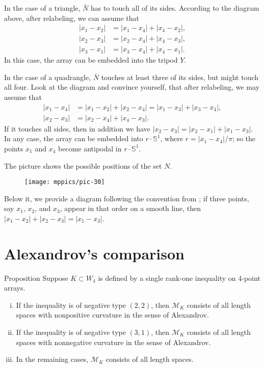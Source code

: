 \documentclass[a4paper,10pt]{article}
\begin{document}
In the case of a triangle, $\bar N$ has to touch all of its sides.
According to the diagram above, after relabeling, we can assume that
\begin{align*}
|x_1-x_2|&=|x_1-x_4|+|x_4-x_2|,
\\
|x_2-x_3|&=|x_2-x_4|+|x_4-x_3|,
\\
|x_3-x_1|&=|x_3-x_4|+|x_4-x_1|.
\end{align*}
In this case, the array can be embedded into the tripod $Y$.

In the case of a quadrangle, $\bar N$ touches at least three of its sides, but might touch all four.
Look at the diagram and convince yourself, that after relabeling, we may assume that
\begin{align*}
|x_1-x_4|&=|x_1-x_2|+|x_2-x_4|=|x_1-x_3|+|x_3-x_4|,
\\
|x_2-x_3|&=|x_2-x_4|+|x_4-x_3|.
\end{align*}
If it touches all sides, then in addition we have $|x_2-x_3|=|x_2-x_1|+|x_1-x_3|$.
In any case, the array can be embedded into $r\cdot \mathbb{S}^1$, where $r=|x_1-x_4|/\pi$;
so the points $x_1$ and $x_4$ become antipodal in $r\cdot \mathbb{S}^1$.
\qeds

The picture shows the possible positions of the set $N$.
\begin{figure}[h!]
\centering
\vskip-0mm
\texttt{[image: mppics/pic-30]}
\vskip-0mm
\end{figure}
Below it, we provide a diagram following the convention from \cite{lebedeva-petrunin-2024};
if three points, say $x_1$, $x_2$, and $x_3$, appear in that order on a smooth line, then $|x_1-x_2|+|x_2-x_3|=|x_1-x_3|$.

\section{Alexandrov's comparison}\label{Alexandrov's comparison}

\begin{thm}{Proposition}\label{prop:Alexandrov's comparison}
Suppose $K\subset W_4$ is defined by a single rank-one inequality on $4$-point arrays.
\begin{enumerate}[(i)]
\item If the inequality is of negative type $(2,2)$, then $\mathcal{M}_K$ consists of all length spaces with nonpositive curvature in the sense of Alexandrov.
\item \label{prop:Alexandrov's comparison:(3,1)} If the inequality is of negative type $(3,1)$, then $\mathcal{M}_K$ consists of all length spaces with nonnegative curvature in the sense of Alexandrov.
\item In the remaining cases, $\mathcal{M}_K$ consists of all length spaces.
\end{enumerate}

\end{thm}
\end{document}

